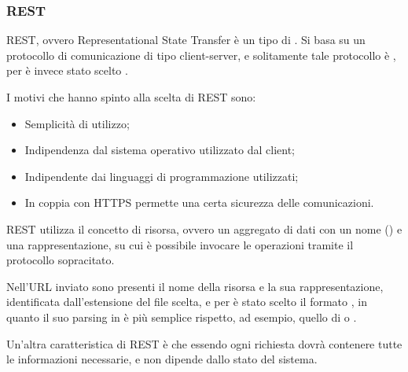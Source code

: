 \subsubsection{REST}

REST, ovvero Representational State Transfer è un tipo di . Si basa su un protocollo di comunicazione  di tipo client-server, e solitamente tale protocollo è , per \ProjectName è invece stato scelto .

I motivi che hanno spinto alla scelta di REST sono:
\begin{itemize}
\item Semplicità di utilizzo;
\item Indipendenza dal sistema operativo utilizzato dal client;
\item Indipendente dai linguaggi di programmazione utilizzati;
\item In coppia con HTTPS permette una certa sicurezza delle comunicazioni.
\end{itemize}

REST utilizza il concetto di risorsa, ovvero un aggregato di dati con un nome () e una rappresentazione, su cui è possibile invocare le operazioni  tramite il protocollo sopracitato.

Nell'URL inviato sono presenti il nome della risorsa e la sua rappresentazione, identificata dall'estensione del file scelta, e per \ProjectName è stato scelto il formato , in quanto il suo parsing in  è più semplice rispetto, ad esempio, quello di  o .

Un'altra caratteristica di REST è che essendo  ogni richiesta dovrà contenere tutte le informazioni necessarie, e non dipende dallo stato del sistema.
